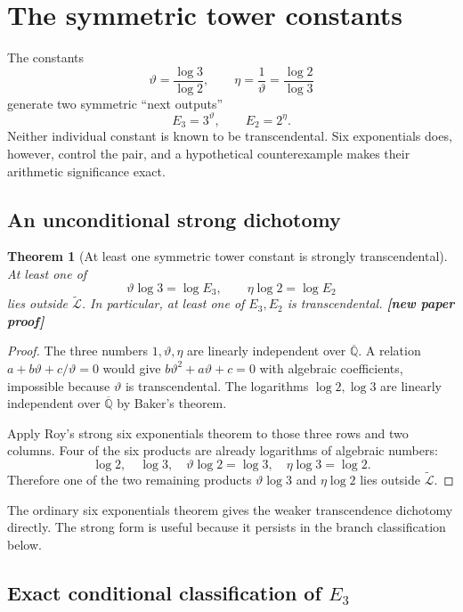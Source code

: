 \documentclass[11pt,oneside]{article}
\newtheorem{theorem}{Theorem}[section]
\theoremstyle{definition}
\theoremstyle{remark}
\newcommand{\Qbar}{\overline{\mathbb Q}}
\newcommand{\LL}{\widetilde{\mathcal L}}
\newcommand{\statusnew}{\textcolor{NewViolet}{\textbf{[new paper proof]}}}
\begin{document}
\section{The symmetric tower constants}\label{sec:symmetric}

The constants
\[
  \vartheta=\frac{\log3}{\log2},
  \qquad
  \eta=\frac1\vartheta=\frac{\log2}{\log3}
\]
generate two symmetric ``next outputs''
\[
  E_3=3^{\vartheta},
  \qquad
  E_2=2^{\eta}.
\]
Neither individual constant is known to be transcendental.  Six exponentials does, however,
control the pair, and a hypothetical counterexample makes their arithmetic significance
exact.

\subsection{An unconditional strong dichotomy}

\begin{theorem}[At least one symmetric tower constant is strongly transcendental]
\label{thm:symmetric-unconditional}
At least one of
\[
  \vartheta\log3=\log E_3,
  \qquad
  \eta\log2=\log E_2
\]
lies outside $\LL$.  In particular, at least one of $E_3,E_2$ is transcendental.
\statusnew
\end{theorem}

\begin{proof}
The three numbers $1,\vartheta,\eta$ are linearly independent over $\Qbar$.  A relation
$a+b\vartheta+c/\vartheta=0$ would give
$b\vartheta^2+a\vartheta+c=0$ with algebraic coefficients, impossible because $\vartheta$ is
transcendental.  The logarithms $\log2,\log3$ are linearly independent over $\Qbar$ by
Baker's theorem.

Apply Roy's strong six exponentials theorem to those three rows and two columns.  Four of the
six products are already logarithms of algebraic numbers:
\[
 \log2,\quad \log3,\quad
 \vartheta\log2=\log3,\quad
 \eta\log3=\log2.
\]
Therefore one of the two remaining products $\vartheta\log3$ and $\eta\log2$ lies outside
$\LL$.
\end{proof}

The ordinary six exponentials theorem gives the weaker transcendence dichotomy directly.  The
strong form is useful because it persists in the branch classification below.

\subsection{Exact conditional classification of \texorpdfstring{$E_3$}{E3}}
\end{document}
